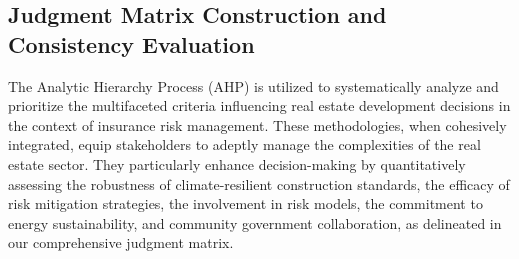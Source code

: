 \documentclass{mcmthesis}
\begin{document}
\subsection{Judgment Matrix Construction and Consistency Evaluation}
The Analytic Hierarchy Process (AHP) is utilized to systematically analyze and prioritize the multifaceted criteria influencing real estate development decisions in the context of insurance risk management. These methodologies, when cohesively integrated, equip stakeholders to adeptly manage the complexities of the real estate sector. They particularly enhance decision-making by quantitatively assessing the robustness of climate-resilient construction standards, the efficacy of risk mitigation strategies, the involvement in risk models, the commitment to energy sustainability, and community government collaboration, as delineated in our comprehensive judgment matrix.
\begin{table}[h]
\centering
\caption{Abbreviated Judgment Matrix for Criteria Comparison}
\label{table:AbbreviatedJudgmentMatrix}
\end{table}
\end{document}
